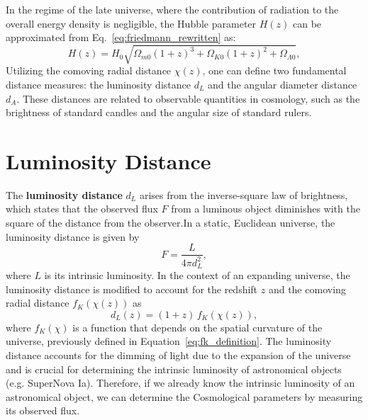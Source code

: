 In the regime of the late universe, where the contribution of radiation to the overall energy density is negligible, the Hubble parameter \( H(z) \) can be approximated from Eq.~\eqref{eq:friedmann_rewritten} as:
\begin{equation}
    H(z) = H_0 \sqrt{\Omega_{m0}(1+z)^3 + \Omega_{K0}(1+z)^2 + \Omega_{\Lambda0}},
    \label{eq:hubble_parameter_late_universe}
\end{equation}
Utilizing the comoving radial distance \( \chi(z) \), one can define two fundamental distance measures: the luminosity distance \( d_L \) and the angular diameter distance \( d_A \). These distances are related to observable quantities in cosmology, such as the brightness of standard candles and the angular size of standard rulers.

\section{Luminosity Distance}
The \textbf{luminosity distance} \( d_L \) arises from the inverse-square law of brightness, which states that the observed flux \( F \) from a luminous object diminishes with the square of the distance from the observer.In a static, Euclidean universe, the luminosity distance is given by
\begin{equation}
    F = \frac{L}{4\pi d_L^2},
    \label{eq:luminosity_flux}
\end{equation}
where \( L \) is its intrinsic luminosity. In the context of an expanding universe, the luminosity distance is modified to account for the redshift \( z \) and the comoving radial distance \( f_K(\chi(z)) \) as
\begin{equation}
    d_L(z) = (1 + z) \, f_K(\chi(z)),
    \label{eq:luminosity_distance}
\end{equation}
where \( f_K(\chi) \) is a function that depends on the spatial curvature of the universe, previously defined in Equation~\eqref{eq:fk_definition}. The luminosity distance accounts for the dimming of light due to the expansion of the universe and is crucial for determining the intrinsic luminosity of astronomical objects (e.g. SuperNova Ia). Therefore, if we already know the intrinsic luminosity of an astronomical object, we can determine the Cosmological parameters by measuring its observed flux.

